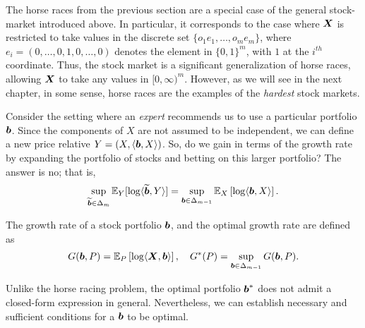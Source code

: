     \begin{remark}
        \label{remark:stock-market-vs-horse-races} The horse races from the previous section are a special case of the general stock-market introduced above. In particular, it corresponds to the case where $\boldsymbol{X}$ is restricted to take values in the discrete set $\{o_1 e_1, \ldots, o_m e_m\}$, where $e_i = (0, \ldots, 0, 1, 0, \ldots, 0)$ denotes the element in $\{0,1\}^m$, with $1$ at the $i^{th}$ coordinate. Thus, the stock market is a significant generalization of horse races, allowing $\boldsymbol{X}$ to take any values in $[0,\infty)^m$. However, as we will see in the next chapter, in some sense, horse races are the examples of the \emph{hardest}  stock markets. 
    \end{remark}

    \begin{remark}
        Consider the setting where an \emph{expert} recommends us to use a particular portfolio $\boldsymbol{b}$. Since the components of $X$ are not assumed to be independent, we can define a new price relative $Y = (X, \langle \boldsymbol{b}, X \rangle)$. So, do we gain in terms of the growth rate by expanding the portfolio of stocks and betting on this larger portfolio? The answer is no; that is, 
        \begin{align}
            \sup_{\widetilde{\boldsymbol{b}} \in \Delta_m} \mathbb{E}_Y[\log \langle \widetilde{\boldsymbol{b}}, Y \rangle ] = \sup_{\boldsymbol{b} \in \Delta_{m-1}} \mathbb{E}_X\left[ \log \langle \boldsymbol{b}, X \rangle \right]. 
        \end{align}
    \end{remark}

    The growth rate of a stock portfolio $\boldsymbol{b}$, and the optimal growth rate are defined  as 
    \begin{align}
        G(\boldsymbol{b}, P) = \mathbb{E}_P\left[ \log \langle \boldsymbol{X}, \boldsymbol{b} \rangle \right], \quad G^*(P) = \sup_{ \boldsymbol{b} \in \Delta_{m-1}}  G(\boldsymbol{b}, P). 
    \end{align}

    Unlike the horse racing problem, the optimal portfolio $\boldsymbol{b}^*$ does not admit a closed-form expression in general. Nevertheless, we can establish necessary and sufficient conditions for a $\boldsymbol{b}$ to be optimal. 

